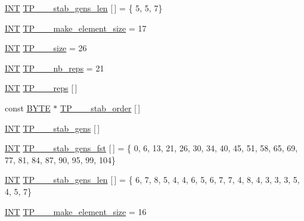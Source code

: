 \begin{DoxyCompactItemize}
\item 
\mbox{\hyperlink{galois_8h_a09fddde158a3a20bd2dcadb609de11dc}{I\+NT}} \mbox{\hyperlink{data___t_p_8_c_a04a109f06d10d81cd5c54624196c8e55}{T\+P\+\_\+\_\+\_\+stab\+\_\+gens\+\_\+len}} \mbox{[}$\,$\mbox{]} = \{ 5, 5, 7\}
\item 
\mbox{\hyperlink{galois_8h_a09fddde158a3a20bd2dcadb609de11dc}{I\+NT}} \mbox{\hyperlink{data___t_p_8_c_aad364fe981e0086307dd12c201591ac5}{T\+P\+\_\+\_\+\_\+make\+\_\+element\+\_\+size}} = 17
\item 
\mbox{\hyperlink{galois_8h_a09fddde158a3a20bd2dcadb609de11dc}{I\+NT}} \mbox{\hyperlink{data___t_p_8_c_ad697eda381bd4db7c98115bdabf13e22}{T\+P\+\_\+\_\+\_\+size}} = 26
\item 
\mbox{\hyperlink{galois_8h_a09fddde158a3a20bd2dcadb609de11dc}{I\+NT}} \mbox{\hyperlink{data___t_p_8_c_af608ea2c3a7c10d27abeada453ad6a3a}{T\+P\+\_\+\_\+\_\+nb\+\_\+reps}} = 21
\item 
\mbox{\hyperlink{galois_8h_a09fddde158a3a20bd2dcadb609de11dc}{I\+NT}} \mbox{\hyperlink{data___t_p_8_c_a6a58b6005bf9547f21b78eac3b02e8f3}{T\+P\+\_\+\_\+\_\+reps}} \mbox{[}$\,$\mbox{]}
\item 
const \mbox{\hyperlink{galois_8h_ab6cc7b4aeb6ea31aba2b3fbfc83ff5e6}{B\+Y\+TE}} $\ast$ \mbox{\hyperlink{data___t_p_8_c_aa2ab4d4376369ac6dac042d3f99cd282}{T\+P\+\_\+\_\+\_\+stab\+\_\+order}} \mbox{[}$\,$\mbox{]}
\item 
\mbox{\hyperlink{galois_8h_a09fddde158a3a20bd2dcadb609de11dc}{I\+NT}} \mbox{\hyperlink{data___t_p_8_c_ae6d36ce9906e9d0367620549e740448b}{T\+P\+\_\+\_\+\_\+stab\+\_\+gens}} \mbox{[}$\,$\mbox{]}
\item 
\mbox{\hyperlink{galois_8h_a09fddde158a3a20bd2dcadb609de11dc}{I\+NT}} \mbox{\hyperlink{data___t_p_8_c_aee3e0e9fc80b34efe2bcbd0c6d3f9351}{T\+P\+\_\+\_\+\_\+stab\+\_\+gens\+\_\+fst}} \mbox{[}$\,$\mbox{]} = \{ 0, 6, 13, 21, 26, 30, 34, 40, 45, 51, 58, 65, 69, 77, 81, 84, 87, 90, 95, 99, 104\}
\item 
\mbox{\hyperlink{galois_8h_a09fddde158a3a20bd2dcadb609de11dc}{I\+NT}} \mbox{\hyperlink{data___t_p_8_c_a74817cf5530b64bcb9deed4133b42898}{T\+P\+\_\+\_\+\_\+stab\+\_\+gens\+\_\+len}} \mbox{[}$\,$\mbox{]} = \{ 6, 7, 8, 5, 4, 4, 6, 5, 6, 7, 7, 4, 8, 4, 3, 3, 3, 5, 4, 5, 7\}
\item 
\mbox{\hyperlink{galois_8h_a09fddde158a3a20bd2dcadb609de11dc}{I\+NT}} \mbox{\hyperlink{data___t_p_8_c_a4115255aba55db56fc7384d94282cc80}{T\+P\+\_\+\_\+\_\+make\+\_\+element\+\_\+size}} = 16

\end{DoxyCompactItemize}
